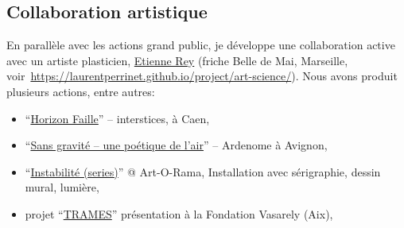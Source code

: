 \documentclass[10pt,french,a4paper,twoside]{article}%
\newcommand{\years}[1]{\marginpar{\textit{\scriptsize #1}}}
\begin{document}
\subsection{Collaboration artistique} %

En parallèle avec les actions grand public, je développe une collaboration active avec un artiste plasticien, \href{https://laurentperrinet.github.io/authors/etienne-rey/}{Etienne Rey} (friche Belle de Mai, Marseille, voir~\url{https://laurentperrinet.github.io/project/art-science/}). Nous avons produit plusieurs actions, entre autres:

\begin{itemize}
	\item ``\href{https://laurentperrinet.github.io/post/2021-10-04_interstices/}{Horizon Faille}'' – interstices, à Caen\years{2021},
	\item ``\href{https://laurentperrinet.github.io/post/2019-06-22_ardemone/}{Sans gravité – une poétique de l’air}'' – Ardenome à Avignon\years{2019},
	\item ``\href{https://laurentperrinet.github.io/post/2018-09-09_artorama/}{Instabilité (series)}''\years{2018} @ Art-O-Rama, Installation avec sérigraphie, dessin mural, lumière,
	\item projet ``\href{https://laurentperrinet.github.io/post/2018-04-10_trames/}{TRAMES}'' présentation à la Fondation Vasarely (Aix)\years{2016},
\end{itemize}
\end{document}
